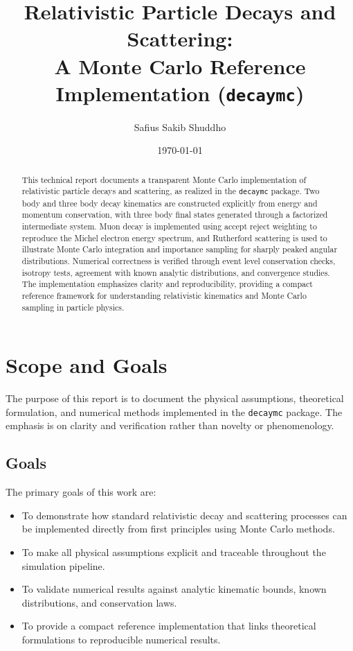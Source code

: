 \documentclass[11pt,a4paper]{article}
\title{Relativistic Particle Decays and Scattering:\\
A Monte Carlo Reference Implementation (\texttt{decaymc})}
\author{Safius Sakib Shuddho}
\date{\today}
\begin{document}
\maketitle

\begin{abstract}
This technical report documents a transparent Monte Carlo implementation of relativistic
particle decays and scattering, as realized in the \texttt{decaymc} package. Two body and
three body decay kinematics are constructed explicitly from energy and momentum
conservation, with three body final states generated through a factorized intermediate
system. Muon decay is implemented using accept reject weighting to reproduce the Michel
electron energy spectrum, and Rutherford scattering is used to illustrate Monte Carlo
integration and importance sampling for sharply peaked angular distributions. Numerical
correctness is verified through event level conservation checks, isotropy tests, agreement
with known analytic distributions, and convergence studies. The implementation emphasizes
clarity and reproducibility, providing a compact reference framework for understanding
relativistic kinematics and Monte Carlo sampling in particle physics.
\end{abstract}


\tableofcontents
\newpage

\section{Scope and Goals}
\label{sec:scope}

The purpose of this report is to document the physical assumptions, theoretical
formulation, and numerical methods implemented in the \texttt{decaymc} package.
The emphasis is on clarity and verification rather than novelty or phenomenology.

\subsection*{Goals}

The primary goals of this work are:
\begin{itemize}
  \item To demonstrate how standard relativistic decay and scattering processes
        can be implemented directly from first principles using Monte Carlo methods.
  \item To make all physical assumptions explicit and traceable throughout the
        simulation pipeline.
  \item To validate numerical results against analytic kinematic bounds, known
        distributions, and conservation laws.
  \item To provide a compact reference implementation that links theoretical
        formulations to reproducible numerical results.
\end{itemize}
\end{document}
